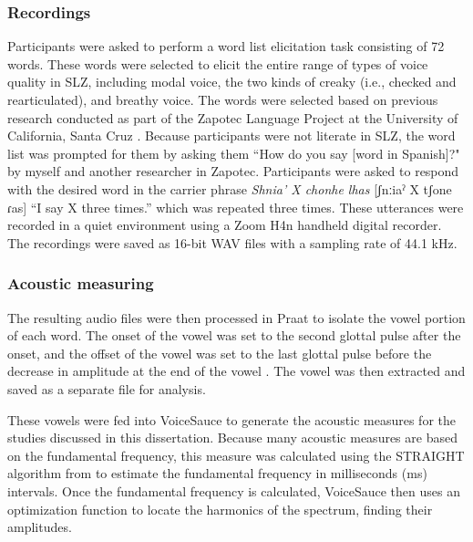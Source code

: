 \subsubsection{Recordings} \label{sec:recordings} 
Participants were asked to perform a word list elicitation task consisting of 72 words. These words were selected to elicit the entire range of types of voice quality in SLZ, including modal voice, the two kinds of creaky (i.e., checked and rearticulated), and breathy voice. The words were selected based on previous research conducted as part of the Zapotec Language Project at the University of California, Santa Cruz \citep{ZapotecLanguageProject}. 
Because participants were not literate in SLZ, the word list was prompted for them by asking them ``How do you say [word in Spanish]?" by myself and another researcher in Zapotec. Participants were asked to respond with the desired word in the carrier phrase \textit{Shnia' X chonhe lhas} [ʃnːiaˀ X tʃone ɾas] ``I say X three times.'' which was repeated three times. These utterances were recorded in a quiet environment using a Zoom H4n handheld digital recorder. The recordings were saved as 16-bit WAV files with a sampling rate of 44.1 kHz.

\subsubsection{Acoustic measuring} \label{sec:acoustics}

The resulting audio files were then processed in Praat to isolate the vowel portion of each word. The onset of the vowel was set to the second glottal pulse after the onset, and the offset of the vowel was set to the last glottal pulse before the decrease in amplitude at the end of the vowel \citep{garellekAcousticDiscriminabilityComplex2020}. The vowel was then extracted and saved as a separate file for analysis.

These vowels were fed into VoiceSauce \citep{shueVoiceSauceProgramVoice2011} to generate the acoustic measures for the studies discussed in this dissertation. Because many acoustic measures are based on the fundamental frequency, this measure was calculated using the STRAIGHT algorithm from \citep{kawaharaInstantaneousfrequencybasedPitchExtraction1998} to estimate the fundamental frequency in milliseconds (ms) intervals. Once the fundamental frequency is calculated, VoiceSauce then uses an optimization function to locate the harmonics of the spectrum, finding their amplitudes.

